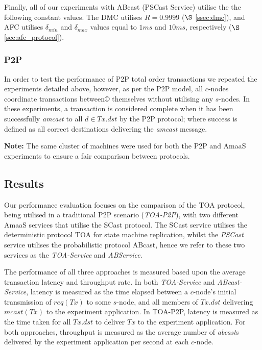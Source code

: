     Finally, all of our experiments with \textsf{ABcast} (\textsf{PSCast} Service) utilise the the following constant values.  The DMC utilises $R=0.9999$ ($\S$ \ref{ssec:dmc}), and AFC utilises $\delta_{min}$ and $\delta_{max}$ values equal to $1ms$ and $10ms$, respectively ($\S$ \ref{sec:afc_protocol}).  
	
	\subsubsection*{P2P}
	In order to test the performance of P2P total order transactions we repeated the experiments detailed above, however, as per the P2P model, all $c$-nodes coordinate transactions between© themselves without utilising any $s$-nodes.  In these experiments, a transaction is considered complete when it has been successfully \emph{amcast} to all $d \in Tx.dst$ by the P2P protocol; where success is defined as all correct destinations delivering the \emph{amcast} message. 
	
	\textbf{Note:} The same cluster of machines were used for both the P2P and \textsf{AmaaS} experiments to ensure a fair comparison between protocols.   
	
	\subsection{Results}\label{sec:AmaaS_results}
	Our performance evaluation focuses on the comparison of the TOA protocol, being utilised in a traditional P2P scenario (\emph{TOA-P2P}), with two different \textsf{AmaaS} services that utilise the \textsf{SCast} protocol.  The \textsf{SCast} service utilises the deterministic protocol TOA for state machine replication, whilst the \emph{PSCast} service utilises the probabilistic protocol \textsf{ABcast}, hence we refer to these two services as the \emph{TOA-Service} and \emph{ABService}.  
    
    The performance of all three approaches is measured based upon the average transaction latency and throughput rate. In both \emph{TOA-Service} and \emph{ABcast-Service}, latency is measured as the time elapsed between a $c$-node's initial transmission of $req(Tx)$ to some $s$-node, and all members of $Tx.dst$ delivering $mcast(Tx)$ to the experiment application. In TOA-P2P, latency is measured as the time taken for all $Tx.dst$ to deliver $Tx$ to the experiment application. For both approaches, throughput is measured as the average number of \emph{abcast}s delivered by the experiment application per second at each $c$-node.
	
